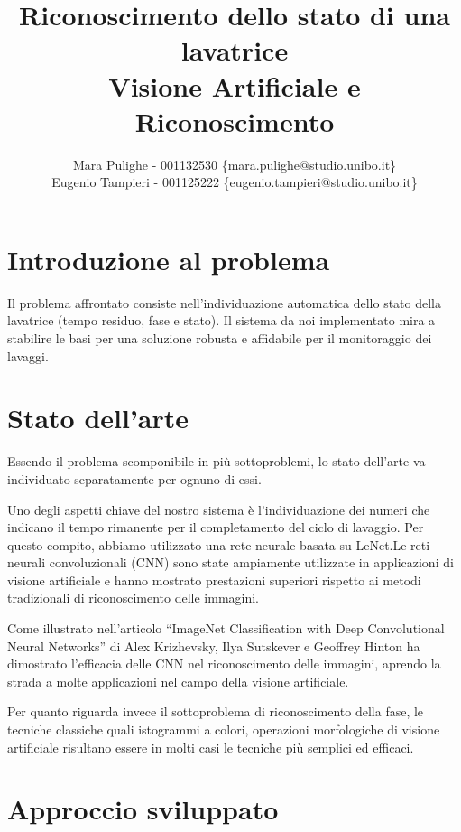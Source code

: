 \documentclass{article}
\title{
    Riconoscimento dello stato di una lavatrice \\
    \large Visione Artificiale e Riconoscimento
}
\author{Mara Pulighe - 001132530 \{mara.pulighe@studio.unibo.it\}\\
        Eugenio Tampieri - 001125222 \{eugenio.tampieri@studio.unibo.it\}}
\begin{document}
\maketitle


\section{Introduzione al problema}\label{introduzione-al-problema}

\par Il problema affrontato consiste nell'individuazione automatica dello
stato della lavatrice (tempo residuo, fase e stato). Il sistema da noi
implementato mira a stabilire le basi per una soluzione robusta e
affidabile per il monitoraggio dei lavaggi.

\section{Stato dell'arte}\label{stato-dellarte}

\par Essendo il problema scomponibile in più sottoproblemi, lo stato
dell'arte va individuato separatamente per ognuno di essi.

\par Uno degli aspetti chiave del nostro sistema è l'individuazione dei
numeri che indicano il tempo rimanente per il completamento del ciclo di
lavaggio. Per questo compito, abbiamo utilizzato una rete neurale basata
su LeNet.Le reti neurali convoluzionali (CNN) sono state ampiamente
utilizzate in applicazioni di visione artificiale e hanno mostrato
prestazioni superiori rispetto ai metodi tradizionali di riconoscimento
delle immagini.

\par Come illustrato nell'articolo ``ImageNet Classification with Deep
Convolutional Neural Networks'' di Alex Krizhevsky, Ilya Sutskever e
Geoffrey Hinton ha dimostrato l'efficacia delle CNN nel riconoscimento
delle immagini, aprendo la strada a molte applicazioni nel campo della
visione artificiale.

\par Per quanto riguarda invece il sottoproblema di riconoscimento della
fase, le tecniche classiche quali istogrammi a colori, operazioni
morfologiche di visione artificiale risultano essere in molti casi le
tecniche più semplici ed efficaci.

\section{Approccio sviluppato}\label{approccio-sviluppato}
\end{document}
